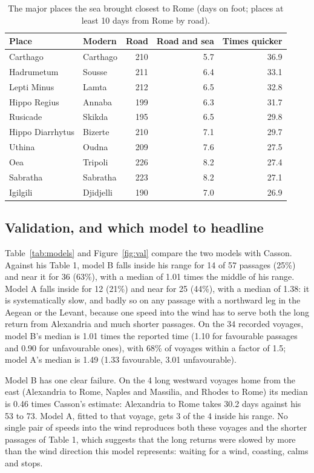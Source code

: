 \documentclass[11pt,a4paper]{article}
\begin{document}
\begin{table}[tbp]\centering\small\caption{The major places the sea brought closest to Rome (days on foot; places at least 10 days from Rome by road).}\label{tab:closest}\begin{tabular}{llrrr}\toprule Place & Modern & Road & Road and sea & Times quicker\\\midrule
Carthago & Carthago & 210 & 5.7 & 36.9\\
Hadrumetum & Sousse & 211 & 6.4 & 33.1\\
Lepti Minus & Lamta & 212 & 6.5 & 32.8\\
Hippo Regius & Annaba & 199 & 6.3 & 31.7\\
Rusicade & Skikda & 195 & 6.5 & 29.8\\
Hippo Diarrhytus & Bizerte & 210 & 7.1 & 29.7\\
Uthina & Oudna & 209 & 7.6 & 27.5\\
Oea & Tripoli & 226 & 8.2 & 27.4\\
Sabratha & Sabratha & 223 & 8.2 & 27.1\\
Igilgili & Djidjelli & 190 & 7.0 & 26.9\\
\bottomrule\end{tabular}\end{table}

\subsection{Validation, and which model to headline}\label{sec:val}
Table~\ref{tab:models} and Figure~\ref{fig:val} compare the two models with Casson. Against his Table 1, model B falls inside his range for 14 of 57 passages (25\%) and near it for 36 (63\%), with a median of 1.01 times the middle of his range. Model A falls inside for 12 (21\%) and near for 25 (44\%), with a median of 1.38: it is systematically slow, and badly so on any passage with a northward leg in the Aegean or the Levant, because one speed into the wind has to serve both the long return from Alexandria and much shorter passages. On the 34 recorded voyages, model B's median is 1.01 times the reported time (1.10 for favourable passages and 0.90 for unfavourable ones), with 68\% of voyages within a factor of 1.5; model A's median is 1.49 (1.33 favourable, 3.01 unfavourable).

Model B has one clear failure. On the 4 long westward voyages home from the east (Alexandria to Rome, Naples and Massilia, and Rhodes to Rome) its median is 0.46 times Casson's estimate: Alexandria to Rome takes 30.2 days against his 53 to 73. Model A, fitted to that voyage, gets 3 of the 4 inside his range. No single pair of speeds into the wind reproduces both these voyages and the shorter passages of Table 1, which suggests that the long returns were slowed by more than the wind direction this model represents: waiting for a wind, coasting, calms and stops.
\end{document}
